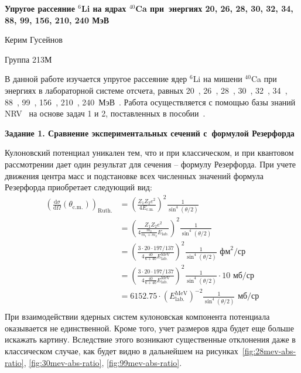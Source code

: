 \documentclass[a4paper, 12pt]{article}
\def\d{\mathrm{d}}
\begin{document}
\begin{center}%
	\textbf{\large Упругое рассеяние $^6$Li на ядрах $^{40}$Ca 
	при~энергиях 20, 26, 28, 30, 32, 34, 88, 99, 156, 210, 240 МэВ}

	Керим Гусейнов

	Группа 213М
\end{center}%

В данной работе изучается упругое рассеяние ядер $^6$Li на мишени 
$^{40}$Ca при энергиях в лабораторной системе отсчета, равных 
20~\cite{20mev}, 26~\cite{26-28-30-34mev}, 
28~\cite{26-28-30-34mev,28-34mev}, 30~\cite{26-28-30-34mev,30mev}, 
32~\cite{32mev}, 34~\cite{26-28-30-34mev,28-34mev}, 88~\cite{88mev}, 
99~\cite{99mev}, 156~\cite{156mev}, 210~\cite{210mev}, 
240~МэВ~\cite{240mev}. Работа осуществляется с помощью базы знаний 
NRV~\cite{nrv} на основе задач 1 и 2, поставленных 
в пособии~\cite{tutorial}.

\begin{center}
	\textbf{\large Задание 1. Сравнение экспериментальных сечений 
	с~формулой Резерфорда}
\end{center}

Кулоновский потенциал уникален тем, что и при классическом, и при 
квантовом рассмотрении дает один результат для сечения -- формулу 
Резерфорда. При учете движения центра масс и подстановке всех численных 
значений формула Резерфорда приобретает следующий вид:
\begin{equation}\begin{aligned}%
	\left(\frac{\d\sigma}{\d\Omega}\left(\theta_{\mathrm{c.m.}}\right)\right)_\text{Ruth.}
	& = \left(\frac{Z_1 Z_2 e^2}{4 E_\text{c.m.}}\right)^2
	\frac{1}{\sin^4\left(\theta/2\right)} \\
	& = \left(\frac{Z_1 Z_2 e^2}{4 \frac{m_2}{m_1 + m_2} E_\text{lab.}}\right)^2
	\frac{1}{\sin^4\left(\theta/2\right)} \\
	& = \left(\frac{3\cdot20 \cdot 197/137}{4 \frac{40}{6 + 40} E_\text{lab.}^\text{MeV}}\right)^2
	\frac{1}{\sin^4\left(\theta/2\right)} \text{ фм}^2/\text{ср} \\
	& = \left(\frac{3\cdot20 \cdot 197/137}{4 \frac{40}{6 + 40} E_\text{lab.}^\text{MeV}}\right)^2
	\frac{1}{\sin^4\left(\theta/2\right)} \cdot 10 \text{ мб/ср} \\
	& = 6152.75 \cdot {(E_\text{lab.}^\text{MeV})^{-2}}
	\frac{1}{\sin^4\left(\theta/2\right)} \text{ мб/ср} \\
	\label{eq:ruth}
\end{aligned}\end{equation}%
При взаимодействии ядерных систем кулоновская компонента потенциала 
оказывается не единственной. Кроме того, учет размеров ядра будет еще 
больше искажать картину. Вследствие этого возникают существенные 
отклонения даже в классическом случае, как будет видно в дальнейшем на 
рисунках~\ref{fig:28mev-abs-ratio}, \ref{fig:30mev-abs-ratio}, 
\ref{fig:99mev-abs-ratio}.
\end{document}

